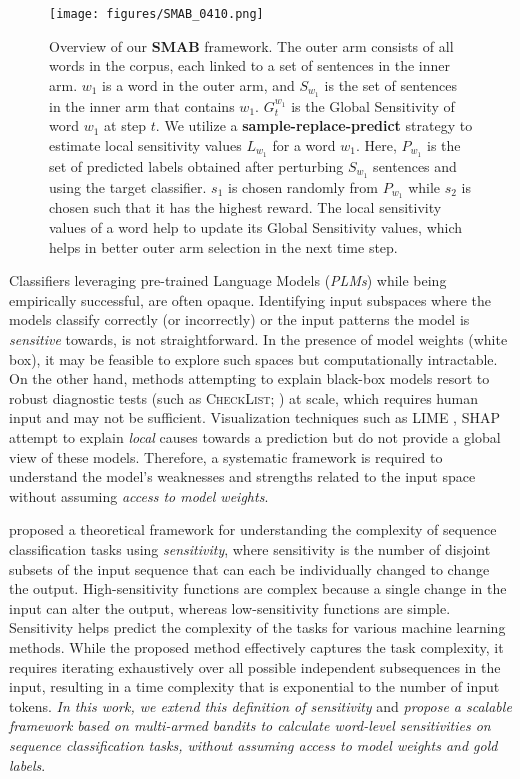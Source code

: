 \begin{figure*}[t]
\texttt{[image: figures/SMAB\_0410.png]}
\caption{Overview of our \textbf{SMAB} framework. The outer arm consists of all words in the corpus, each linked to a set of sentences in the inner arm. $w_1$ is a word in the outer arm, and $S_{w_1}$ is the set of sentences in the inner arm that contains $w_1$. $G_t^{w_1}$ is the Global Sensitivity of word $w_1$ at step $t$. We utilize a \textbf{sample-replace-predict} strategy to estimate local sensitivity values $L_{w_1}$ for a word $w_1$. Here, $P_{w_1}$ is the set of predicted labels obtained after perturbing $S_{w_1}$ sentences and using the target classifier. $s_1$ is chosen randomly from $P_{w_1}$ while $s_2$ is chosen such that it has the highest reward. The local sensitivity values of a word help to update its Global Sensitivity values, which helps in better outer arm selection in the next time step.
}
\label{fig:MABframework}
\end{figure*}

Classifiers leveraging pre-trained Language Models (\textit{PLMs}) while being empirically successful, are often opaque. Identifying input subspaces where the models classify correctly (or incorrectly) or the input patterns the model is \textit{sensitive} towards, is not straightforward. In the presence of model weights (white box), it may be feasible to explore such spaces but computationally intractable. On the other hand, methods attempting to explain black-box models resort to robust diagnostic tests (such as \textsc{CheckList}; \citet{ribeiro-etal-2020-beyond}) at scale, which requires human input and may not be sufficient. Visualization techniques such as LIME \cite{ribeiro2016whyitrustyou}, SHAP \cite{lundberg2017unifiedapproachinterpretingmodel} attempt to explain \textit{local} causes towards a prediction but do not provide a global view of these models.
Therefore, a systematic framework is required to understand the model's weaknesses and strengths related to the input space without assuming \textit{access to model weights}. 

\citet{hahn-etal-2021-sensitivity} proposed a theoretical framework for understanding the complexity of sequence classification tasks using {\em sensitivity}, where sensitivity is the number of disjoint subsets of the input sequence that can each be individually changed to change the output. High-sensitivity functions are complex because a single change in the input can alter the output, whereas low-sensitivity functions are simple. Sensitivity helps predict the complexity of the tasks for various machine learning methods. While the proposed method effectively captures the task complexity, it requires iterating exhaustively over all possible independent subsequences in the input, resulting in a time complexity that is exponential to the number of input tokens. 
\textit{In this work, we extend this definition of sensitivity} and \textit{propose a scalable framework based on multi-armed bandits to calculate word-level sensitivities on sequence classification tasks, without assuming access to model weights and gold labels}. 

